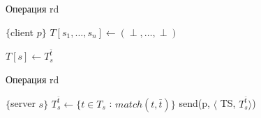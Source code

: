 \begin{algorithm}[H]
	\caption{Операция rd}\label{alg3}
	\begin{algorithmic}[1]
		\Statex $\{$client $p \}$
		\State $T[s_1, \dots, s_n] \gets (\perp, \dots, \perp)$
		
		\State {}
		\EndFor
		
		\Repeat
		\State {}
		\State $T[s] \gets T_s^{\bar t}$
		
		\State {}
		\EndIf
		\State \Return{$\perp$}
		\EndFunction
	\end{algorithmic}
\end{algorithm}
\begin{algorithm}[H]
	\caption{Операция rd}\label{alg4}
	\begin{algorithmic}[1]
		\Statex $\{$server $s \}$
		\State $T_s^{\bar t} \gets \{t \in T_s$ : $match(t, \bar t)\}$
		\State send(p, $\langle$ TS, $T_s^{\bar t}\rangle$)
		\EndUpon
	\end{algorithmic}
\end{algorithm}

